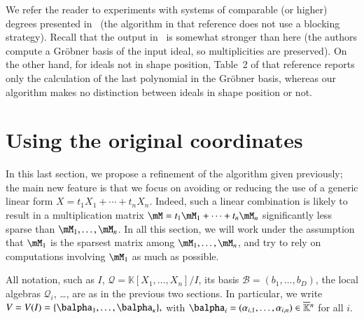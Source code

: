 \documentclass[final,1p,times,authoryear]{elsarticle}
\newcommand{\basis}{\mathscr{B}}
\newcommand{\lf}{X}
\newcommand{\residueI}{\mathscr{Q}}
\newcommand{\trsp}[1]{#1^{\mathsf{T}}} %
\def\dg{\kappa}
\def\K{\mathbb{K}}
\def\K {\ensuremath{\mathbb{K}}}
\def\Kbar {{\ensuremath{\overline{\mathbb{K}}}}}
\newcommand{\mUt}{\trsp{\mU}}
\begin{document}
We refer the reader to experiments with systems of comparable (or
higher) degrees presented in~\citep{FaMo17} (the algorithm in that
reference does not use a blocking strategy). Recall that the output
in~\citep{FaMo17} is somewhat stronger than here (the authors compute a
Gr\"obner basis of the input ideal, so multiplicities are preserved). On
the other hand, for ideals not in shape position, Table~2 of that
reference reports only the calculation of the last polynomial in the
Gr\"obner basis, whereas our algorithm makes no distinction between
ideals in shape position or not.



\section{Using the original coordinates}\label{sec:original}

In this last section, we propose a refinement of the algorithm given
previously; the main new feature is that we focus on avoiding or reducing the
use of a generic linear form $\lf = t_1 X_1 + \cdots + t_n X_n$.  Indeed, such
a linear combination is likely to result in a multiplication matrix $\mM = t_1
\mM_1 + \cdots + t_n \mM_n$ significantly less sparse than $\mM_1,\dots,\mM_n$.
In all this section, we will work under the assumption that $\mM_1$ is the
sparsest matrix among $\mM_1,\dots,\mM_n$, and try to rely on computations
involving $\mM_1$ as much as possible.

All notation, such as $I$, $\residueI=\K[X_1,\dots,X_n]/I$, its basis
$\basis=(b_1,\dots,b_D)$, the local algebras $\residueI_i$, \dots, are as in the  previous two sections.
In particular, we write $V=V(I)=\{\balpha_1,\dots,\balpha_\dg\},$ with
$\balpha_i=(\alpha_{i,1},\dots,\alpha_{i,n}) \in \Kbar{}^n$ for all $i$.
\end{document}
